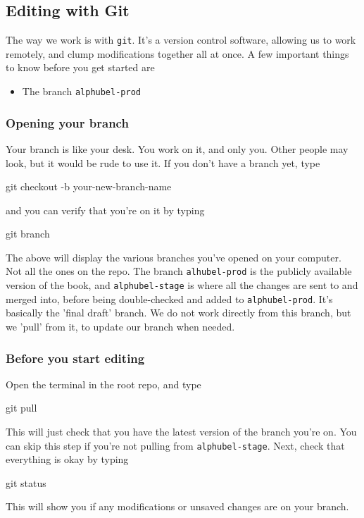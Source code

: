 \documentclass{article}
\begin{document}
    \subsection{Editing with Git}

    The way we work is with \texttt{git}.
    It's a version control software, allowing us to work remotely, and clump modifications together all at once.
    A few important things to know before you get started are
    \begin{itemize}
        \item The branch \texttt{alphubel-prod}
    \end{itemize}
    \subsubsection{Opening your branch}
    Your branch is like your desk.
    You work on it, and only you.
    Other people may look, but it would be rude to use it.
    If you don't have a branch yet, type
    \begin{bashcode}
        git checkout -b your-new-branch-name
    \end{bashcode}
    and you can verify that you're on it by typing
    \begin{bashcode}
        git branch
    \end{bashcode}
    The above will display the various branches you've opened on your computer.
    Not all the ones on the repo.
    The branch \texttt{alhubel-prod} is the publicly available version of the book, and \texttt{alphubel-stage} is where all the changes are sent to and merged into, before being double-checked and added to \texttt{alphubel-prod}.
    It's basically the 'final draft' branch.
    We do not work directly from this branch, but we 'pull' from it, to update our branch when needed.
    \subsubsection{Before you start editing}
    Open the terminal in the root repo, and type
    \begin{bashcode}
        git pull
    \end{bashcode}
    This will just check that you have the latest version of the branch you're on.
    You can skip this step if you're not pulling from \texttt{alphubel-stage}.
    Next, check that everything is okay by typing
    \begin{bashcode}
        git status
    \end{bashcode}
    This will show you if any modifications or unsaved changes are on your branch.
\end{document}
